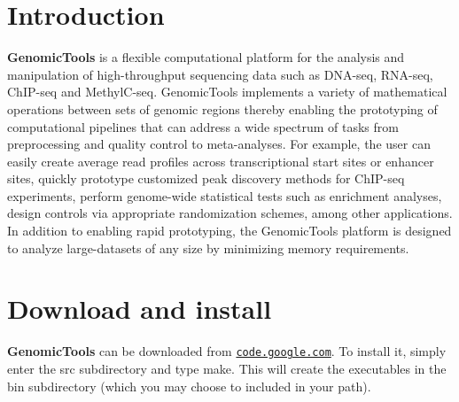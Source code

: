 \hypertarget{index_intro}{}\section{Introduction}\label{index_intro}
{\bfseries GenomicTools} is a flexible computational platform for the analysis and manipulation of high-\/throughput sequencing data such as DNA-\/seq, RNA-\/seq, ChIP-\/seq and MethylC-\/seq. GenomicTools implements a variety of mathematical operations between sets of genomic regions thereby enabling the prototyping of computational pipelines that can address a wide spectrum of tasks from preprocessing and quality control to meta-\/analyses. For example, the user can easily create average read profiles across transcriptional start sites or enhancer sites, quickly prototype customized peak discovery methods for ChIP-\/seq experiments, perform genome-\/wide statistical tests such as enrichment analyses, design controls via appropriate randomization schemes, among other applications. In addition to enabling rapid prototyping, the GenomicTools platform is designed to analyze large-\/datasets of any size by minimizing memory requirements.\hypertarget{index_download}{}\section{Download and install}\label{index_download}
{\bfseries GenomicTools} can be downloaded from \href{http://code.google.com/p/ibm-cbc-genomic-tools/}{\tt code.google.com}. To install it, simply enter the src subdirectory and type make. This will create the executables in the bin subdirectory (which you may choose to included in your path). 
